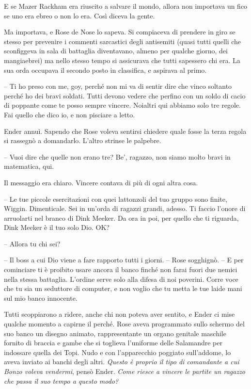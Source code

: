 {E se Mazer Rackham era riuscito a salvare il mondo, allora non
	importava un fico se uno era ebreo o non lo era. Così diceva la gente.}

{Ma importava, e Rose de Nose lo sapeva. Si compiaceva di prendere in
	giro se stesso per prevenire i commenti sarcastici degli antisemiti
	(quasi tutti quelli che sconfiggeva in sala di battaglia diventavano,
	almeno per qualche giorno, dei mangiaebrei) ma nello stesso tempo si
	assicurava che tutti sapessero chi era. La sua orda occupava il secondo
	posto in classifica, e aspirava al primo.}

{-- Ti ho preso con me, goy, perché non mi va di sentir dire che vinco
	soltanto perché ho dei bravi soldati. Tutti devono vedere che perfino
	con un soldo di cacio di poppante come te posso sempre vincere. Noialtri
	qui abbiamo solo tre regole. Fai quello che dico io, e non pisciare a
	letto.}

{Ender annuì. Sapendo che Rose voleva sentirsi chiedere quale fosse la
	terza regola si rassegnò a domandarlo. L'altro strinse le palpebre.}

{-- Vuoi dire che quelle non erano tre? Be', ragazzo, non siamo molto
	bravi in matematica, qui.}

{Il messaggio era chiaro. Vincere contava di più di ogni altra cosa.}

{-- Le tue piccole esercitazioni con quei lattonzoli del tuo gruppo sono
	finite, Wiggin. Dimenticale. Sei in un'orda di ragazzi grandi, adesso.
	Ti faccio l'onore di arruolarti nel branco di Dink Meeker. Da ora in
	poi, per quello che ti riguarda, Dink Meeker è il tuo solo Dio. OK?}

{-- Allora tu chi sei?}

{-- Il boss a cui Dio viene a fare rapporto tutti i giorni. -- Rose
	sogghignò. -- E per cominciare ti è proibito usare ancora il banco
	finché non farai fuori due nemici nella stessa battaglia. L'ordine serve
	solo alla difesa di noi poverini. Corre voce che tu sia un seduttore di
	computer, e non voglio che tu metta le tue laide mani sul mio banco
	innocente.}

{Tutti scoppiarono a ridere, anche chi non poteva aver sentito, e Ender
	ci mise qualche momento a capirne il perché. Rose aveva programmato
	sullo schermo del suo banco un disegno animato, rappresentante un organo
	genitale maschile fornito di braccia e gambe che si toglieva l'uniforme
	delle Salamandre per indossare quella dei Topi. Nudo e con l'apparecchio
	poggiato sull'addome, lo aveva inviato ai banchi degli altri.
	\emph{Questo è proprio il tipo di comandante a cui Bonzo voleva
		vendermi}, \emph{} pensò Ender. \emph{Come riesce a vincere le partite
		un ragazzo che passa il suo tempo a questo modo?}}

